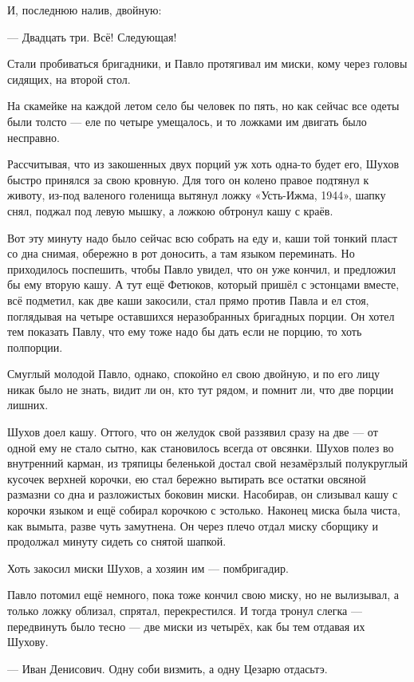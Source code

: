 И, последнюю налив, двойную:

--- Двадцать три. Всё! Следующая!

Стали пробиваться бригадники, и Павло протягивал им миски, кому через головы сидящих, на
второй стол.

На скамейке на каждой летом село бы человек по пять, но как сейчас все одеты были толсто ---
еле по четыре умещалось, и то ложками им двигать было несправно.

Рассчитывая, что из закошенных двух порций уж хоть одна-то будет его, Шухов быстро принялся
за свою кровную. Для того он колено правое подтянул к животу, из-под валеного голенища
вытянул ложку «Усть-Ижма, 1944», шапку снял, поджал под левую мышку, а ложкою обтронул кашу с
краёв.

Вот эту минуту надо было сейчас всю собрать на еду и, каши той тонкий пласт со дна снимая,
обережно в рот доносить, а там языком переминать. Но приходилось поспешить, чтобы Павло
увидел, что он уже кончил, и предложил бы ему вторую кашу. А тут ещё Фетюков, который пришёл с
эстонцами вместе, всё подметил, как две каши закосили, стал прямо против Павла и ел стоя,
поглядывая на четыре оставшихся неразобранных бригадных порции. Он хотел тем показать
Павлу, что ему тоже надо бы дать если не порцию, то хоть полпорции.

Смуглый молодой Павло, однако, спокойно ел свою двойную, и по его лицу никак было не знать,
видит ли он, кто тут рядом, и помнит ли, что две порции лишних.

Шухов доел кашу. Оттого, что он желудок свой раззявил сразу на две --- от одной ему не стало
сытно, как становилось всегда от овсянки. Шухов полез во внутренний карман, из тряпицы
беленькой достал свой незамёрзлый полукруглый кусочек верхней корочки, ею стал бережно
вытирать все остатки овсяной размазни со дна и разложистых боковин миски. Насобирав, он
слизывал кашу с корочки языком и ещё собирал корочкою с эстолько. Наконец миска была чиста,
как вымыта, разве чуть замутнена. Он через плечо отдал миску сборщику и продолжал минуту
сидеть со снятой шапкой.

Хоть закосил миски Шухов, а хозяин им --- помбригадир.

Павло потомил ещё немного, пока тоже кончил свою миску, но не вылизывал, а только ложку
облизал, спрятал, перекрестился. И тогда тронул слегка --- передвинуть было тесно --- две миски
из четырёх, как бы тем отдавая их Шухову.

--- Иван Денисович. Одну соби визмить, а одну Цезарю отдасьтэ.

